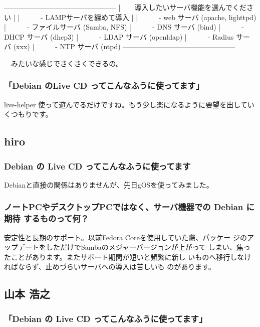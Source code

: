 \documentclass[mingoth,a4paper]{jsarticle}
\begin{document}
\begin{commandline}
 ------------------------------------------------
 |　　導入したいサーバ機能を選んでください
 |
 |　　　- LAMPサーバを纏めて導入
 |
 |　　　- web サーバ (apache, lighttpd)
 |　　　- ファイルサーバ (Samba, NFS)
 |　　　- DNS サーバ (bind)
 |　　　- DHCP サーバ (dhcp3)
 |　　　- LDAP サーバ (openldap)
 |　　　- Radius サーバ (xxx)
 |　　　- NTP サーバ (ntpd)
 ------------------------------------------------
\end{commandline}

　みたいな感じでさくさくできるの。

\subsubsection{「Debian のLive CD ってこんなふうに使ってます」}
 live-helper 使って遊んでるだけですね。もう少し楽になるように要望を出していくつもりです。

\subsection{hiro}

\subsubsection{Debian の Live CD ってこんなふうに使ってます}

Debianと直接の関係はありませんが、先日gOSを使ってみました。

\subsubsection{ノートPCやデスクトップPCではなく、サーバ機器での Debian に期待
するものって何？}

安定性と長期のサポート。以前Fedora Coreを使用していた際、パッケー
ジのアップデートをしただけでSambaのメジャーバージョンが上がって
しまい、焦ったことがあります。またサポート期間が短いと頻繁に新し
いものへ移行しなければならず、止めづらいサーバへの導入は苦しいも
のがあります。

\subsection{山本 浩之}

\subsubsection{「Debian の Live CD ってこんなふうに使ってます」}
\end{document}
